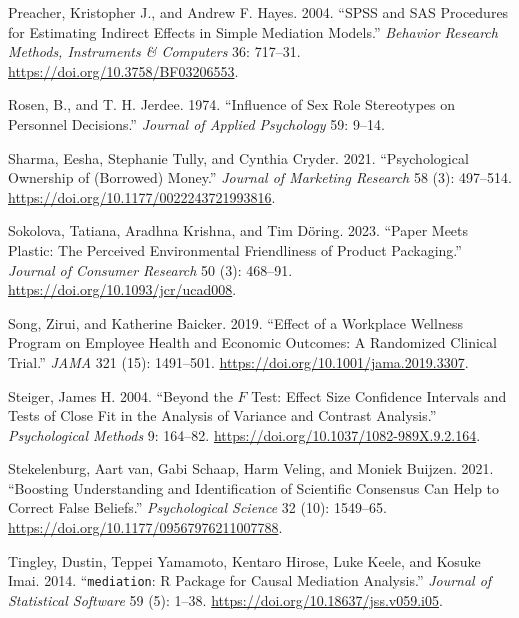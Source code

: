 \documentclass[
  11pt,
  letterpaper,
]{scrbook}
\newlength{\cslhangindent}
\newlength{\cslentryspacingunit} %
\newenvironment{CSLReferences}[2] %
 {%
  \setlength{\parindent}{0pt}
  \ifodd #1
  \let\oldpar\par
  \def\par{\hangindent=\cslhangindent\oldpar}
  \fi
  \setlength{\parskip}{#2\cslentryspacingunit}
 }%
 {}
\theoremstyle{definition}
\theoremstyle{remark}
\begin{document}
\begin{CSLReferences}{1}{0}
\leavevmode{}%
Preacher, Kristopher J., and Andrew F. Hayes. 2004. {``{SPSS} and {SAS}
Procedures for Estimating Indirect Effects in Simple Mediation
Models.''} \emph{Behavior Research Methods, Instruments {\&} Computers}
36: 717--31. \url{https://doi.org/10.3758/BF03206553}.

\leavevmode{}%
Rosen, B., and T. H. Jerdee. 1974. {``Influence of Sex Role Stereotypes
on Personnel Decisions.''} \emph{Journal of Applied Psychology} 59:
9--14.

\leavevmode{}%
Sharma, Eesha, Stephanie Tully, and Cynthia Cryder. 2021.
{``Psychological Ownership of (Borrowed) Money.''} \emph{Journal of
Marketing Research} 58 (3): 497--514.
\url{https://doi.org/10.1177/0022243721993816}.

\leavevmode{}%
Sokolova, Tatiana, Aradhna Krishna, and Tim Döring. 2023. {``Paper Meets
Plastic: The Perceived Environmental Friendliness of Product
Packaging.''} \emph{Journal of Consumer Research} 50 (3): 468--91.
\url{https://doi.org/10.1093/jcr/ucad008}.

\leavevmode{}%
Song, Zirui, and Katherine Baicker. 2019. {``Effect of a Workplace
Wellness Program on Employee Health and Economic Outcomes: A Randomized
Clinical Trial.''} \emph{JAMA} 321 (15): 1491--501.
\url{https://doi.org/10.1001/jama.2019.3307}.

\leavevmode{}%
Steiger, James H. 2004. {``Beyond the \(F\) Test: Effect Size Confidence
Intervals and Tests of Close Fit in the Analysis of Variance and
Contrast Analysis.''} \emph{Psychological Methods} 9: 164--82.
\url{https://doi.org/10.1037/1082-989X.9.2.164}.

\leavevmode{}%
Stekelenburg, Aart van, Gabi Schaap, Harm Veling, and Moniek Buijzen.
2021. {``Boosting Understanding and Identification of Scientific
Consensus Can Help to Correct False Beliefs.''} \emph{Psychological
Science} 32 (10): 1549--65.
\url{https://doi.org/10.1177/09567976211007788}.

\leavevmode{}%
Tingley, Dustin, Teppei Yamamoto, Kentaro Hirose, Luke Keele, and Kosuke
Imai. 2014. {``\texttt{mediation}: {R} Package for Causal Mediation
Analysis.''} \emph{Journal of Statistical Software} 59 (5): 1--38.
\url{https://doi.org/10.18637/jss.v059.i05}.


\end{CSLReferences}
\end{document}
